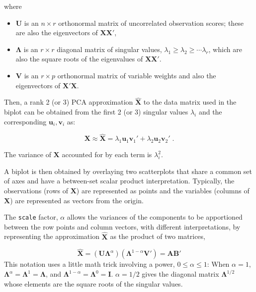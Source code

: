 \documentclass[
  letterpaper,
  10pt,
  krantz2]{krantz}
\providecommand{\tightlist}{%
  \setlength{\itemsep}{0pt}\setlength{\parskip}{0pt}}\usepackage{longtable,booktabs,array}
\begin{document}
where

\begin{itemize}
\tightlist
\item
  \(\mathbf{U}\) is an \(n \times r\) orthonormal matrix of uncorrelated
  observation scores; these are also the eigenvectors of
  \(\mathbf{X} \mathbf{X}'\),
\item
  \(\mathbf{\Lambda}\) is an \(r \times r\) diagonal matrix of singular
  values, \(\lambda_1 \ge \lambda_2 \ge \cdots \lambda_r\), which are
  also the square roots of the eigenvalues of
  \(\mathbf{X} \mathbf{X}'\).
\item
  \(\mathbf{V}\) is an \(r \times p\) orthonormal matrix of variable
  weights and also the eigenvectors of \(\mathbf{X}' \mathbf{X}\).
\end{itemize}

Then, a rank 2 (or 3) PCA approximation \(\widehat{\mathbf{X}}\) to the
data matrix used in the biplot can be obtained from the first 2 (or 3)
singular values \(\lambda_i\) and the corresponding
\(\mathbf{u}_i, \mathbf{v}_i\) as:

\[
\mathbf{X} \approx \widehat{\mathbf{X}} = \lambda_1 \mathbf{u}_1 \mathbf{v}_1' + \lambda_2 \mathbf{u}_2 \mathbf{v}_2' \; .
\]

The variance of \(\mathbf{X}\) accounted for by each term is
\(\lambda_i^2\).

A biplot is then obtained by overlaying two scatterplots that share a
common set of axes and have a between-set scalar product interpretation.
Typically, the observations (rows of \(\mathbf{X}\)) are represented as
points and the variables (columns of \(\mathbf{X}\)) are represented as
vectors from the origin.

The \texttt{scale} factor, \(\alpha\) allows the variances of the
components to be apportioned between the row points and column vectors,
with different interpretations, by representing the approximation
\(\widehat{\mathbf{X}}\) as the product of two matrices,

\[
\widehat{\mathbf{X}} = (\mathbf{U} \mathbf{\Lambda}^\alpha) (\mathbf{\Lambda}^{1-\alpha} \mathbf{V}') = \mathbf{A} \mathbf{B}'
\] This notation uses a little math trick involving a power,
\(0 \le \alpha \le 1\): When \(\alpha = 1\),
\(\mathbf{\Lambda}^\alpha = \mathbf{\Lambda}^1 =\mathbf{\Lambda}\), and
\(\mathbf{\Lambda}^{1-\alpha} = \mathbf{\Lambda}^0 =\mathbf{I}\).
\(\alpha = 1/2\) gives the diagonal matrix \(\mathbf{\Lambda}^{1/2}\)
whose elements are the square roots of the singular values.
\end{document}
